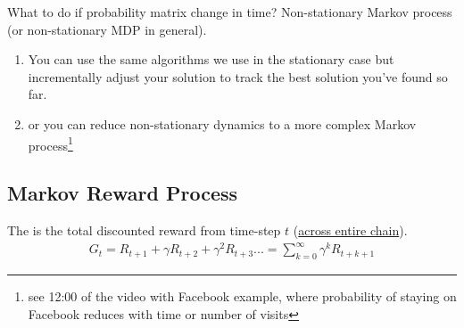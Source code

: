 \begin{notebox}
What to do if probability matrix change in time? Non-stationary Markov process (or non-stationary MDP in general).


\begin{enumerate}
	\item  You can use the same algorithms we use in the stationary case but incrementally adjust your solution to track the best solution you've found so far.
	\item or you can reduce non-stationary dynamics to a more complex Markov process\footnote{see 12:00 of the video with Facebook example, where probability of staying on Facebook reduces with time or number of visits}
\end{enumerate}
\end{notebox}


\subsection{Markov Reward Process}
\label{sec:MRP}

The  is the total discounted reward from time-step $t$ (\underline{across entire chain}).
\begin{align}
	G_t = R_{t+1}+ \gamma R_{t+2} + \gamma^2 R_{t+3} ... = \sum_{k=0}^{\infty} \gamma^k R_{t+k+1}
\end{align}

